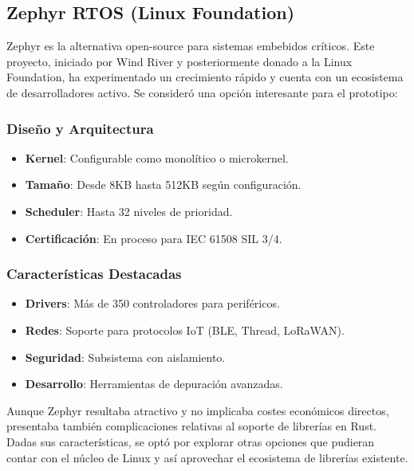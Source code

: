     \newpage
    \subsection{Zephyr RTOS (Linux Foundation)}
        Zephyr es la alternativa open-source para sistemas embebidos críticos. Este proyecto, iniciado por Wind River y posteriormente donado a la Linux Foundation, ha experimentado un crecimiento rápido y cuenta con un ecosistema de desarrolladores activo. Se consideró una opción interesante para el prototipo:

        \subsubsection{Diseño y Arquitectura}
            \begin{itemize}
                \item \textbf{Kernel}: Configurable como monolítico o microkernel.
                \item \textbf{Tamaño}: Desde 8KB hasta 512KB según configuración.
                \item \textbf{Scheduler}: Hasta 32 niveles de prioridad.
                \item \textbf{Certificación}: En proceso para IEC 61508 SIL 3/4.
            \end{itemize}

        \subsubsection{Características Destacadas}
            \begin{itemize}
                \item \textbf{Drivers}: Más de 350 controladores para periféricos.
                \item \textbf{Redes}: Soporte para protocolos IoT (BLE, Thread, LoRaWAN).
                \item \textbf{Seguridad}: Subsistema con aislamiento.
                \item \textbf{Desarrollo}: Herramientas de depuración avanzadas.
            \end{itemize}

        Aunque Zephyr resultaba atractivo y no implicaba costes económicos directos, presentaba también complicaciones relativas al soporte de librerías en Rust. Dadas sus características, se optó por explorar otras opciones que pudieran contar con el núcleo de Linux y así aprovechar el ecosistema de librerías existente.

